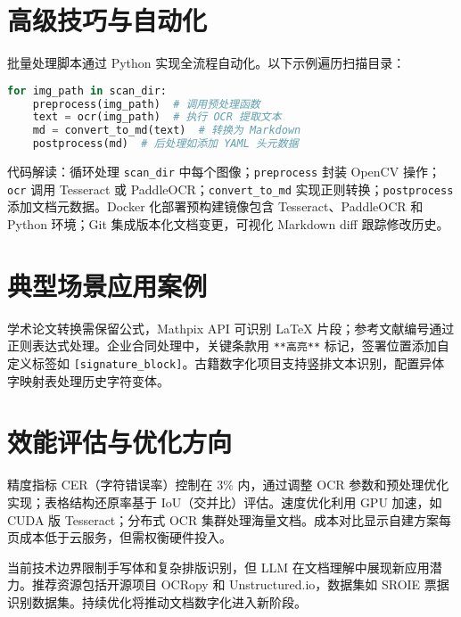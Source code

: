 \chapter{高级技巧与自动化}
批量处理脚本通过 Python 实现全流程自动化。以下示例遍历扫描目录：\par
\begin{lstlisting}[language=python]
for img_path in scan_dir:
    preprocess(img_path)  # 调用预处理函数
    text = ocr(img_path)  # 执行 OCR 提取文本
    md = convert_to_md(text)  # 转换为 Markdown
    postprocess(md)  # 后处理如添加 YAML 头元数据
\end{lstlisting}
代码解读：循环处理 \texttt{scan\_{}dir} 中每个图像；\texttt{preprocess} 封装 OpenCV 操作；\texttt{ocr} 调用 Tesseract 或 PaddleOCR；\texttt{convert\_{}to\_{}md} 实现正则转换；\texttt{postprocess} 添加文档元数据。Docker 化部署预构建镜像包含 Tesseract、PaddleOCR 和 Python 环境；Git 集成版本化文档变更，可视化 Markdown diff 跟踪修改历史。\par
\chapter{典型场景应用案例}
学术论文转换需保留公式，Mathpix API 可识别 LaTeX 片段；参考文献编号通过正则表达式处理。企业合同处理中，关键条款用 \texttt{**高亮**} 标记，签署位置添加自定义标签如 \texttt{[signature\_{}block]}。古籍数字化项目支持竖排文本识别，配置异体字映射表处理历史字符变体。\par
\chapter{效能评估与优化方向}
精度指标 CER（字符错误率）控制在 3\%{} 内，通过调整 OCR 参数和预处理优化实现；表格结构还原率基于 IoU（交并比）评估。速度优化利用 GPU 加速，如 CUDA 版 Tesseract；分布式 OCR 集群处理海量文档。成本对比显示自建方案每页成本低于云服务，但需权衡硬件投入。\par
当前技术边界限制手写体和复杂排版识别，但 LLM 在文档理解中展现新应用潜力。推荐资源包括开源项目 OCRopy 和 Unstructured.io，数据集如 SROIE 票据识别数据集。持续优化将推动文档数字化进入新阶段。\par
